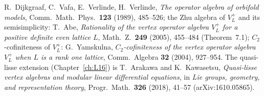 R.~Dijkgraaf, C.~Vafa, E.~Verlinde, H.~Verlinde, \emph{The operator algebra of orbifold models}, Comm.\ Math.\ Phys.\
\textbf{123} (1989), 485--526; the Zhu algebra of $V_L^+$ and its semisimplicity: T.~Abe, \emph{Rationality of the vertex
operator algebra $V_L^+$ for a positive definite even lattice $L$}, Math.\ Z.\ \textbf{249} (2005), 455--484 (Theorem~7.1);
$C_2$-cofiniteness of $V_L^+$: G.~Yamskulna, \emph{$C_2$-cofiniteness of the vertex operator algebra $V_L^+$ when $L$ is a
rank one lattice}, Comm.\ Algebra \textbf{32} (2004), 927--954. The quasi-lisse extension
(Chapter~\ref{ch:L16}) is T.~Arakawa and K.~Kawasetsu, \emph{Quasi-lisse vertex algebras and modular linear differential
equations}, in \emph{Lie groups, geometry, and representation theory}, Progr.\ Math.\ \textbf{326} (2018), 41--57
(arXiv:1610.05865).

\endgroup
